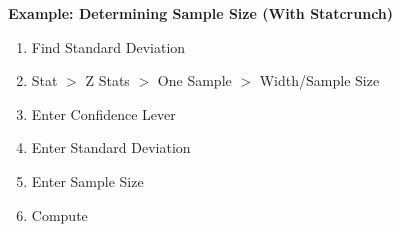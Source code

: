 \documentclass{report}
\begin{document}
    \bigbreak \noindent 
    \begin{mdframed}
      \textbf{Example: Determining Sample Size (With Statcrunch)}
      \begin{enumerate}
          \item Find Standard Deviation
        \item Stat $> $ Z Stats $> $ One Sample $> $ Width/Sample Size
        \item Enter Confidence Lever
        \item Enter Standard Deviation
        \item Enter Sample Size
        \item Compute
      \end{enumerate}
    \end{mdframed}

    \pagebreak \bigbreak \noindent 
\end{document}
